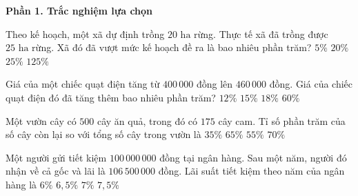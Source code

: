 \textbf{Phần 1. Trắc nghiệm lựa chọn}

\begin{ex} %
Theo kế hoạch, một xã dự định trồng $20\text{ ha}$ rừng. Thực tế xã đã trồng được $25\text{ ha}$ rừng. Xã đó đã vượt mức kế hoạch đề ra là bao nhiêu phần trăm?
\choice
{$5\%$}
{$20\%$}
{\True $25\%$}
{$125\%$}
\end{ex}

\begin{ex} %
Giá của một chiếc quạt điện tăng từ $400\,000$ đồng lên $460\,000$ đồng. Giá của chiếc quạt điện đó đã tăng thêm bao nhiêu phần trăm?
\choice
{$12\%$}
{\True $15\%$}
{$18\%$}
{$60\%$}
\end{ex}

\begin{ex} %
Một vườn cây có $500$ cây ăn quả, trong đó có $175$ cây cam. Tỉ số phần trăm của số cây còn lại so với tổng số cây trong vườn là
\choice
{$35\%$}
{\True $65\%$}
{$55\%$}
{$70\%$}
\end{ex}

\begin{ex} %
Một người gửi tiết kiệm $100\,000\,000$ đồng tại ngân hàng. Sau một năm, người đó nhận về cả gốc và lãi là $106\,500\,000$ đồng. Lãi suất tiết kiệm theo năm của ngân hàng là
\choice
{$6\%$}
{\True $6{,}5\%$}
{$7\%$}
{$7{,}5\%$}
\end{ex}

